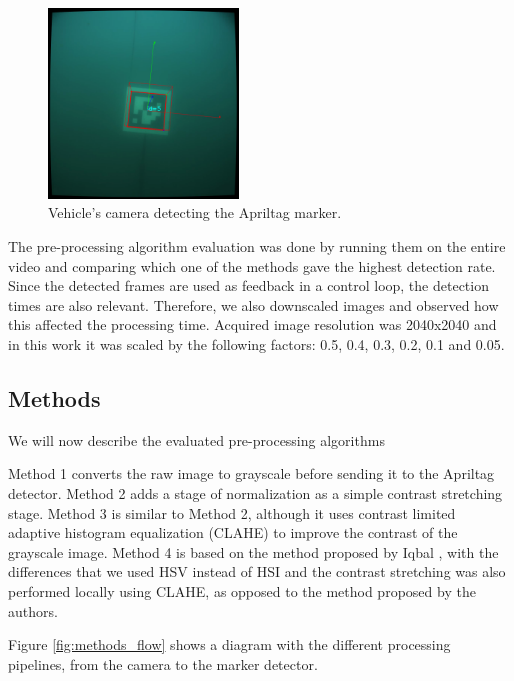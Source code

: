 \documentclass[conference, letterpaper]{IEEEtran}
\begin{document}
\begin{figure}[!htpb]
	\centering
	\includegraphics[width=0.45\textwidth]{./fig/april_ocean3.png}
    \caption{Vehicle's camera detecting the Apriltag marker.}
    \label{fig:apriltags_ocean}
\end{figure}

The pre-processing algorithm evaluation was done by running them on the
entire video and comparing which one of the methods gave the highest detection
rate. Since the detected frames are used as feedback in a control loop, the
detection times are also relevant. Therefore, we also downscaled images and
observed how this affected the processing time. Acquired image resolution was
2040x2040 and in this work it was scaled by the following factors: 0.5, 0.4, 0.3, 0.2,
0.1 and 0.05.

\subsection{Methods}

We will now describe the evaluated pre-processing algorithms 

Method 1 converts the raw image to grayscale
before sending it to the Apriltag detector. Method 2 adds a stage of
normalization as a simple contrast stretching stage. Method 3 is similar to
Method 2, although it uses contrast limited adaptive histogram equalization (CLAHE)
\cite{zuiderveld1994contrast} to improve the contrast of the grayscale image.
Method 4 is based on the method proposed by Iqbal \cite{iqbal2007underwater},
with the differences that we used HSV instead of HSI and the contrast stretching was
also performed locally using CLAHE, as opposed to the method proposed by
the authors.

Figure \ref{fig:methods_flow} shows a diagram with the different processing
pipelines, from the camera to the marker detector.

\end{document}
